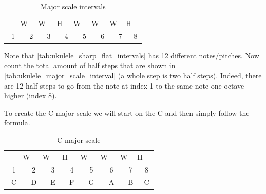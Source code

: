 \begin{table}[h]
	\centering
	\begin{tabular}{*{16}{c}}
		& \multicolumn{2}{P{4mm}}{\large{W}} & \multicolumn{2}{P{4mm}}{\large{W}} & \multicolumn{2}{P{4mm}}{\large{H}} & \multicolumn{2}{P{4mm}}{\large{W}} & \multicolumn{2}{P{4mm}}{\large{W}} & \multicolumn{2}{P{4mm}}{\large{W}} & \multicolumn{2}{P{4mm}}{\large{H}} & \\
		\multicolumn{2}{P{4mm}}{1} & \multicolumn{2}{P{4mm}}{2} & \multicolumn{2}{P{4mm}}{3} & \multicolumn{2}{P{4mm}}{4} & \multicolumn{2}{P{4mm}}{5} & \multicolumn{2}{P{4mm}}{6} & \multicolumn{2}{P{4mm}}{7} & \multicolumn{2}{P{4mm}}{8}
	\end{tabular}
	\caption{Major scale intervals}
	\label{tab:ukulele_major_scale_interval}
\end{table}

Note that \autoref{tab:ukulele_sharp_flat_intervals} has 12 different notes/pitches. Now count the total amount of half steps that are shown in \autoref{tab:ukulele_major_scale_interval} (a whole step is two half steps). Indeed, there are 12 half steps to go from the note at index 1 to the same note one octave higher (index 8).

To create the C major scale we will start on the C and then simply follow the formula.

\begin{table}[h]
	\centering
	\begin{tabular}{*{16}{c}}
		& \multicolumn{2}{P{4mm}}{\large{W}} & \multicolumn{2}{P{4mm}}{\large{W}} & \multicolumn{2}{P{4mm}}{\large{H}} & \multicolumn{2}{P{4mm}}{\large{W}} & \multicolumn{2}{P{4mm}}{\large{W}} & \multicolumn{2}{P{4mm}}{\large{W}} & \multicolumn{2}{P{4mm}}{\large{H}} & \\
		\multicolumn{2}{P{4mm}}{1} & \multicolumn{2}{P{4mm}}{2} & \multicolumn{2}{P{4mm}}{3} & \multicolumn{2}{P{4mm}}{4} & \multicolumn{2}{P{4mm}}{5} & \multicolumn{2}{P{4mm}}{6} & \multicolumn{2}{P{4mm}}{7} & \multicolumn{2}{P{4mm}}{8} \\
		\multicolumn{2}{P{4mm}}{C} & \multicolumn{2}{P{4mm}}{D} & \multicolumn{2}{P{4mm}}{E} & \multicolumn{2}{P{4mm}}{F} & \multicolumn{2}{P{4mm}}{G} & \multicolumn{2}{P{4mm}}{A} & \multicolumn{2}{P{4mm}}{B} & \multicolumn{2}{P{4mm}}{C}
	\end{tabular}
	\caption{C major scale}
	\label{tab:ukulele_c_major_scale}
\end{table}

\newpage

